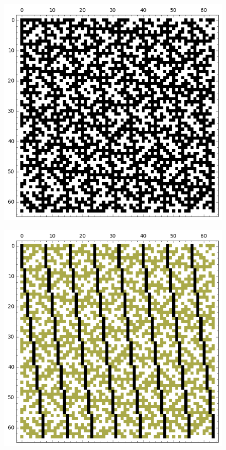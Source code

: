 \documentclass[pdf,sprung,slideColor,nocolorBG]{beamer}
\newenvironment{colortheme}[1]{
\def\ProvidesPackageRCS $##1${\relax}
\renewcommand{\ProcessOptions}{\relax}
\makeatletter

\makeatother
}{}
\begin{document}
\begin{colortheme}{jubata}
\begin{frame}
\begin{figure}
\begin{minipage}{.48\textwidth}
  \includegraphics[width=.9\linewidth]{../matrix_plot/re6_2_weight_class_matrix.png}
  \label{fig:6_2_weight_class_matrix}
\end{minipage}%
\begin{minipage}{.48\textwidth}
  \centering
  \includegraphics[width=.9\linewidth]{../matrix_plot/re6_2_bent_cayley_graph_index_matrix.png}

\end{minipage}
\end{figure}
\end{frame}
\end{colortheme}
\end{document}
